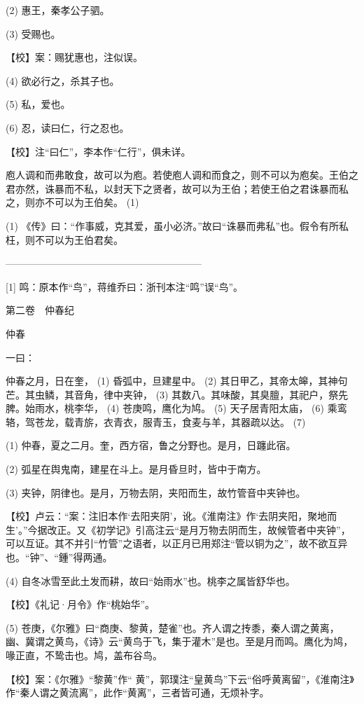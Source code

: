 \documentclass[12pt,UTF8]{ctexbook}
\begin{document}
(2) 惠王，秦孝公子驷。

(3) 受赐也。

【校】案：赐犹惠也，注似误。

(4) 欲必行之，杀其子也。

(5) 私，爱也。

(6) 忍，读曰仁，行之忍也。

【校】注“曰仁”，李本作“仁行”，俱未详。

庖人调和而弗敢食，故可以为庖。若使庖人调和而食之，则不可以为庖矣。王伯之君亦然，诛暴而不私，以封天下之贤者，故可以为王伯；若使王伯之君诛暴而私之，则亦不可以为王伯矣。 (1)

(1) 《传》曰：“作事威，克其爱，虽小必济。”故曰“诛暴而弗私”也。假令有所私枉，则不可以为王伯君矣。




————————————————————

[1] 鸣：原本作“鸟”，蒋维乔曰：浙刊本注“鸣”误“鸟”。





第二卷　仲春纪



仲春


一曰：

仲春之月，日在奎， (1) 昏弧中，旦建星中。 (2) 其日甲乙，其帝太皞，其神句芒。其虫鳞，其音角，律中夹钟， (3) 其数八。其味酸，其臭膻，其祀户，祭先脾。始雨水，桃李华， (4) 苍庚鸣，鹰化为鸠。 (5) 天子居青阳太庙， (6) 乘鸾辂，驾苍龙，载青旂，衣青衣，服青玉，食麦与羊，其器疏以达。 (7)

(1) 仲春，夏之二月。奎，西方宿，鲁之分野也。是月，日躔此宿。

(2) 弧星在舆鬼南，建星在斗上。是月昏旦时，皆中于南方。

(3) 夹钟，阴律也。是月，万物去阴，夹阳而生，故竹管音中夹钟也。

【校】卢云：“案：注旧本作‘去阳夹阴’，讹。《淮南注》作‘去阴夹阳，聚地而生’。”今据改正。又《初学记》引高注云“是月万物去阴而生，故候管者中夹钟”，可以互证。其不并引“竹管”之语者，以正月已用郑注“管以铜为之”，故不欲互异也。“钟”、“鍾”得两通。

(4) 自冬冰雪至此土发而耕，故曰“始雨水”也。桃李之属皆舒华也。

【校】《礼记·月令》作“桃始华”。

(5) 苍庚，《尔雅》曰“商庚、黎黄，楚雀”也。齐人谓之抟黍，秦人谓之黄离，幽、冀谓之黄鸟，《诗》云“黄鸟于飞，集于灌木”是也。至是月而鸣。鹰化为鸠，喙正直，不鸷击也。鸠，盖布谷鸟。

【校】案：《尔雅》“黎黄”作“ 黄”，郭璞注“皇黄鸟”下云“俗呼黄离留”，《淮南注》作“秦人谓之黄流离”，此作“黄离”，三者皆可通，无烦补字。
\end{document}
